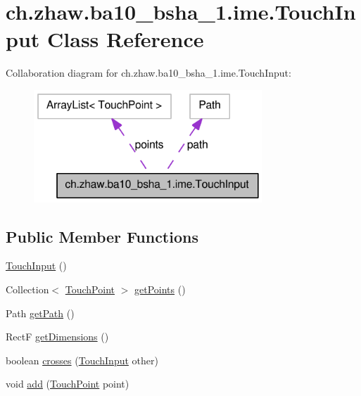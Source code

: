 \hypertarget{classch_1_1zhaw_1_1ba10__bsha__1_1_1ime_1_1TouchInput}{
\section{ch.zhaw.ba10\_\-bsha\_\-1.ime.TouchInput Class Reference}
\label{classch_1_1zhaw_1_1ba10__bsha__1_1_1ime_1_1TouchInput}
}
Collaboration diagram for ch.zhaw.ba10\_\-bsha\_\-1.ime.TouchInput:\nopagebreak
\begin{figure}[H]
\begin{center}
\leavevmode
\includegraphics[width=243pt]{classch_1_1zhaw_1_1ba10__bsha__1_1_1ime_1_1TouchInput__coll__graph}
\end{center}
\end{figure}
\subsection*{Public Member Functions}
\begin{DoxyCompactItemize}
\item 
\hyperlink{classch_1_1zhaw_1_1ba10__bsha__1_1_1ime_1_1TouchInput_a35e5a2dafdadf1379ce628ff01dec0f6}{TouchInput} ()
\item 
Collection$<$ \hyperlink{classch_1_1zhaw_1_1ba10__bsha__1_1_1TouchPoint}{TouchPoint} $>$ \hyperlink{classch_1_1zhaw_1_1ba10__bsha__1_1_1ime_1_1TouchInput_a12f25294b93d8e24ab3186f2c3e8e1b9}{getPoints} ()
\item 
Path \hyperlink{classch_1_1zhaw_1_1ba10__bsha__1_1_1ime_1_1TouchInput_a109b88f906f350c5d4c25abc5fd6f95e}{getPath} ()
\item 
RectF \hyperlink{classch_1_1zhaw_1_1ba10__bsha__1_1_1ime_1_1TouchInput_ac68086768e724f1c1847b31dca3cc851}{getDimensions} ()
\item 
boolean \hyperlink{classch_1_1zhaw_1_1ba10__bsha__1_1_1ime_1_1TouchInput_adb0a9fe73a2091ae7c3bdebe40be8a25}{crosses} (\hyperlink{classch_1_1zhaw_1_1ba10__bsha__1_1_1ime_1_1TouchInput}{TouchInput} other)
\item 
void \hyperlink{classch_1_1zhaw_1_1ba10__bsha__1_1_1ime_1_1TouchInput_a658d320b9d5c19adcbcd583476ef59e1}{add} (\hyperlink{classch_1_1zhaw_1_1ba10__bsha__1_1_1TouchPoint}{TouchPoint} point)
\end{DoxyCompactItemize}
